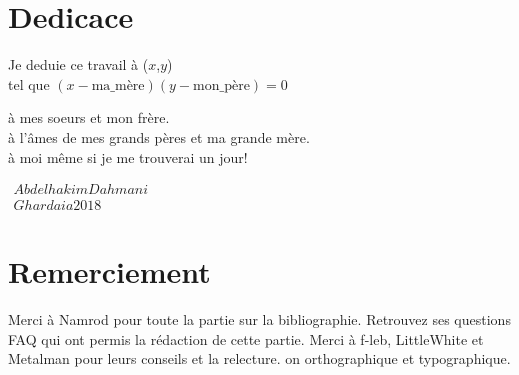 \chapter*{Dedicace}
\centering Je deduie ce travail à ($x$,$y$) \\
 \hfill tel que $(x-\text{ma\_mère})(y-\text{mon\_père})= 0 $
 \vspace{2cm}
 
\centering à mes soeurs et mon frère.\\
\centering à l'âmes de mes grands pères et ma grande mère.\\
\centering à moi même si je me trouverai un jour! 
 
 
 
 

 \vfill \hfill
 $\begin{array}{r}
   Abdelhakim   Dahmani \\
   Ghardaia   2018 
  \end{array} $ 



\chapter*{Remerciement}
Merci à Namrod pour toute la partie sur la bibliographie. Retrouvez ses questions FAQ qui ont permis la rédaction de cette partie.
 Merci à f-leb, LittleWhite et Metalman pour leurs conseils et la relecture.
on orthographique et typographique.
\thispagestyle{plain}


